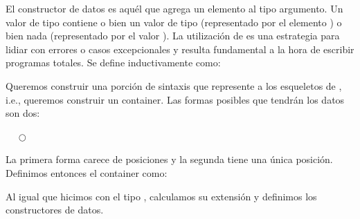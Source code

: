 
\begin{example} El constructor de datos  es aquél que agrega un elemento al tipo argumento.
Un valor de tipo   contiene o bien un valor  de tipo  (representado por el elemento   ) o bien nada (representado por el valor ). La utilización de  es una estrategia para lidiar con errores o casos excepcionales y resulta fundamental a la hora de escribir programas totales. 
  Se define inductivamente como:
  

  Queremos construir una porción de sintaxis que represente a los esqueletos de , i.e., queremos construir un container. Las formas posibles que tendrán los datos son dos:

  \begin{center}
   $\quad$ $\bigcirc$
  \end{center}
  
  La primera forma carece de posiciones y la segunda tiene una única posición. Definimos entonces el container  como:


  Al igual que hicimos con el tipo , calculamos su extensión y definimos los constructores de datos.

\end{example}
\vspace{2ex}



